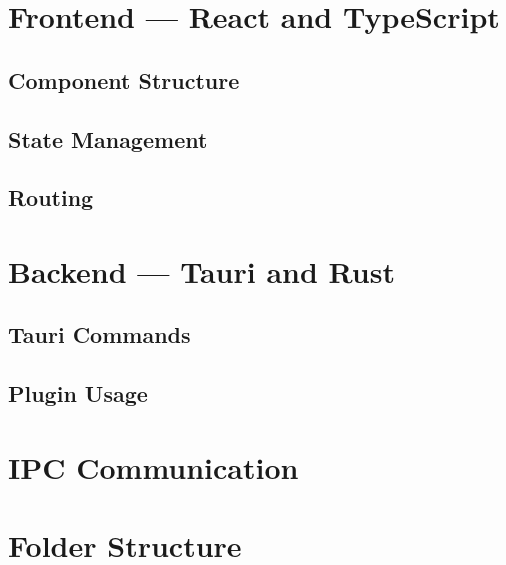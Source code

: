 \documentclass[12pt, a4paper]{report}
\begin{document}
	\section{Frontend --- React and TypeScript}
	
	\subsection{Component Structure}
	
	\subsection{State Management}
	
	\subsection{Routing}
	
	\section{Backend --- Tauri and Rust}
	
	\subsection{Tauri Commands}
	
	\subsection{Plugin Usage}
	
	\section{IPC Communication}
	
	\section{Folder Structure}
	
\end{document}
